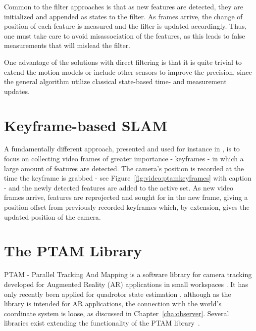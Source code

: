         Common to the filter approaches is that as new features are detected,
        they are initialized and appended as states to the filter.
        As frames arrive, the change of position of each feature is measured and
        the filter is updated accordingly.
        Thus, one must take care to avoid misassociation of the features, as
        this leads to false measurements that will mislead the filter.

        One advantage of the solutions with direct filtering is that it is quite
        trivial to extend the motion models or include other sensors to improve the precision, since
        the general algorithm utilize classical state-based time- and measurement updates.

    \section{Keyframe-based SLAM}
    \label{eq:video:kfslam}
        A fundamentally different approach, presented and used for instance in \citep{klein07parallel},
        is to focus on collecting video frames of greater importance - keyframes -
        in which a large amount of features are detected.
        The camera's position is recorded at the time the keyframe is grabbed - see Figure~\ref{fig:video:ptamkeyframes} with caption -
        and the newly detected features are added to the active set.
        As new video frames arrive, features are reprojected and sought for in
        the new frame, giving a position offset from previously recorded keyframes which, by
        extension, gives the updated position of the camera.


\pagebreak
    \section{The PTAM Library}
        PTAM - Parallel Tracking And Mapping is a software library for camera tracking
        developed for Augmented Reality (AR) applications in small workspaces \citep{klein07parallel}.
        It has only recently been applied for quadrotor state estimation \citep{weiss11monocular},
        although as the library is intended for AR applications, the connection
        with the world's coordinate system is loose, as discussed in Chapter~\ref{cha:observer}.
        Several libraries exist extending the functionality of the PTAM library~\citep{Nguyen_Sandor_Park_2010}.

